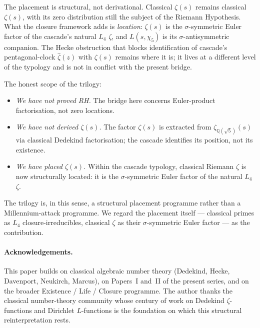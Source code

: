 \documentclass[11pt,a4paper]{article}
\theoremstyle{definition}
\theoremstyle{remark}
\begin{document}
The placement is structural, not derivational. Classical $\zeta(s)$
remains classical $\zeta(s)$, with its zero distribution still the
subject of the Riemann Hypothesis. What the closure framework adds is
\emph{location}: $\zeta(s)$ is the $\sigma$-symmetric Euler factor of
the cascade's natural $L_4$ $\zeta$, and $L(s, \chi_5)$ is its
$\sigma$-antisymmetric companion. The Hecke obstruction that blocks
identification of cascade's pentagonal-clock $\hat{\zeta}(z)$ with
$\zeta(s)$ remains where it is; it lives at a different level of the
typology and is not in conflict with the present bridge.

The honest scope of the trilogy:
\begin{itemize}
\item \emph{We have not proved RH.} The bridge here concerns
      Euler-product factorisation, not zero locations.
\item \emph{We have not derived $\zeta(s)$.} The factor $\zeta(s)$ is
      extracted from $\zeta_{\mathbb{Q}(\sqrt{5})}(s)$ via classical
      Dedekind factorisation; the cascade identifies its position, not
      its existence.
\item \emph{We have placed $\zeta(s)$.} Within the cascade typology,
      classical Riemann $\zeta$ is now structurally located: it is the
      $\sigma$-symmetric Euler factor of the natural $L_4$ $\zeta$.
\end{itemize}

The trilogy is, in this sense, a structural placement programme rather
than a Millennium-attack programme. We regard the placement itself ---
classical primes as $L_4$ closure-irreducibles, classical $\zeta$ as
their $\sigma$-symmetric Euler factor --- as the contribution.

\paragraph{Acknowledgements.}
This paper builds on classical algebraic number theory (Dedekind,
Hecke, Davenport, Neukirch, Marcus), on Papers~I and~II of the present
series, and on the broader Existence / Life / Closure programme. The
author thanks the classical number-theory community whose century of
work on Dedekind $\zeta$-functions and Dirichlet $L$-functions is the
foundation on which this structural reinterpretation rests.



\end{document}
